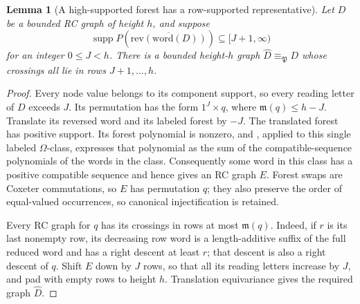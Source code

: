 \documentclass{amsart}
\newtheorem{lemma}{Lemma}[subsection]
\theoremstyle{definition}
\theoremstyle{remark}
\numberwithin{equation}{subsection}
\newcommand{\forest}{\mathfrak{P}}
\newcommand{\maxd}{\mathfrak{m}}
\begin{document}
\begin{lemma}[A high-supported forest has a row-supported representative]\label{lemma:foresthighrows}
Let $D$ be a bounded RC graph of height $h$, and suppose
$$\operatorname{supp}P\!\left(\overline{\mathrm{rev}(\mathrm{word}(D))}\right)
  \subseteq[J+1,\infty)$$
for an integer $0\leq J<h$. There is a bounded height-$h$ graph $\widehat D\equiv_\forest D$ whose crossings all lie in rows $J+1,\ldots,h$.
\end{lemma}
\begin{proof}
Every node value belongs to its component support, so every reading letter of $D$ exceeds $J$. Its permutation has the form $1^J\times q$, where $\maxd(q)\leq h-J$. Translate its reversed word and its labeled forest by $-J$. The translated forest has positive support. Its forest polynomial is nonzero, and \cite[Proposition~5.10]{nadeau2024forest}, applied to this single labeled $\Omega$-class, expresses that polynomial as the sum of the compatible-sequence polynomials of the words in the class. Consequently some word in this class has a positive compatible sequence and hence gives an RC graph $E$. Forest swaps are Coxeter commutations, so $E$ has permutation $q$; they also preserve the order of equal-valued occurrences, so canonical injectification is retained.

Every RC graph for $q$ has its crossings in rows at most $\maxd(q)$. Indeed, if $r$ is its last nonempty row, its decreasing row word is a length-additive suffix of the full reduced word and has a right descent at least $r$; that descent is also a right descent of $q$. Shift $E$ down by $J$ rows, so that all its reading letters increase by $J$, and pad with empty rows to height $h$. Translation equivariance gives the required graph $\widehat D$.
\end{proof}
\end{document}

